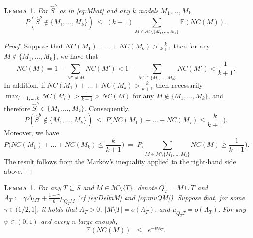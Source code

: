 \documentclass[bj,authoryear]{imsart}
\theoremstyle{plain}
\newtheorem{lem}[thm]{\textsc{Lemma}}
\newcommand{\E}{\mathbb{E}}
\newcommand{\M}{\mathcal{M}}
\begin{document}
\begin{lem}\label{lem:L0toL1convergencegen} For $\hat S^b$ as in \eqref{eq:Mhat} and any $k$ models $M_1,\ldots,M_k$
$$P(\hat{S}^b\not\in \{M_1,\ldots,M_k\})\;\leq\; (k+1) \sum_{M \in \M\setminus \{M_1,\ldots,M_k\}}\E\left( NC(M)\right).$$
\end{lem}

\begin{proof}
Suppose that $NC(M_1)+\ldots+NC(M_k)>\frac{k}{k+1}$ then for any $M\not\in \{M_1,\ldots,M_k\}$, we have that
$$NC(M)= 1-\sum_{M' \neq M} NC(M') < 1 - \sum_{M' \in \{M_1,\ldots,M_k\}} NC(M') < \frac{1}{k+1}.$$ 
In addition, if $NC(M_1)+\ldots+NC(M_k)>\frac{k}{k+1}$ then necessarily $\max_{l=1,\ldots,k}NC(M_l)> \frac{1}{k+1} > NC(M) $ for any $M \not\in \{M_1,\ldots,M_k\}$, and therefore $\hat{S}^{b}\in \{M_1,\ldots,M_k\}$. Consequently, 
$$
P(\hat{S}^b\not\in \{M_1,\ldots,M_k\})\; \leq\; P\Big(NC(M_1)+\ldots+NC(M_k)\leq\frac{k}{k+1}\Big).$$
Moreover, we have
$$P\Big(NC(M_1)+\ldots+NC(M_k)\leq\frac{k}{k+1}\Big)\;=\;P\Big(\sum_{M \in \M\setminus \{M_1,\ldots,M_k\}} NC(M)\geq \frac{1}{k+1}\Big).$$
The result follows from the Markov's inequality applied to the right-hand side above.
\end{proof}

\begin{lem}\label{lem:boundexpnc} For any $T\subseteq S$ and $M\in \M\setminus\{T\}$, denote $Q_T= M\cup T$ and $A_T:=\gamma\Delta_{MT}+\tfrac{1-\gamma}{6}\mu_{Q_TM}$ (\emph{cf} \eqref{eq:DeltaM} and \eqref{eq:muQM}). Suppose that, for some $\gamma \in (1/2,1]$, it holds that $A_T>0$, $|M\setminus T|=o(A_T)$, and $\mu_{Q_T T}=o(A_T)$. For any $\psi\in(0,1)$ and every $n$ large enough,
$$\E\left(NC(M)\right)  \;\;\leq\;\; e^{-\psi A_T}.$$
\end{lem}
\end{document}
